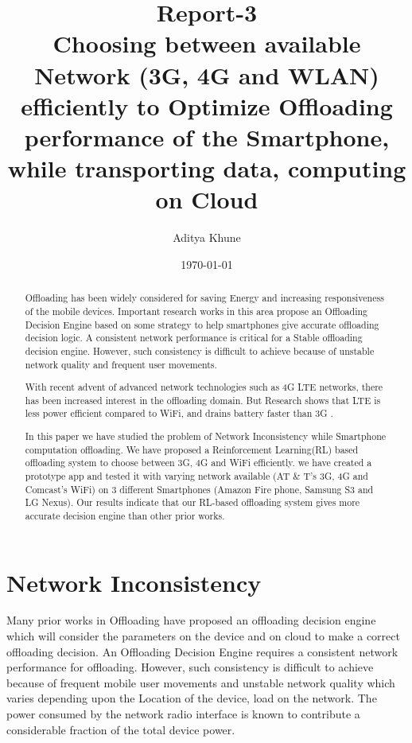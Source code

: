 \documentclass[12pt, twocolumn]{article}
\begin{document}
\title{Report-3\\
Choosing between available Network (3G, 4G and WLAN)\\
efficiently to Optimize Offloading performance of the Smartphone, while transporting data, computing on Cloud}

\author{Aditya Khune}

\date{\today}  %
\maketitle
\tableofcontents



\begin{abstract}
Offloading has been widely considered for saving Energy and increasing responsiveness of the mobile devices.
Important research works in this area propose an Offloading Decision Engine based on some strategy to help smartphones give accurate offloading decision logic. A consistent network performance is critical for a Stable offloading decision engine. However, such consistency is difficult to achieve because of unstable network quality and frequent user movements. 

With recent advent of advanced network technologies such as 4G LTE networks, there has been increased interest in the offloading domain. But Research shows that LTE is less power efficient compared to WiFi, and drains battery faster than 3G \cite{huang2012close}.

In this paper we have studied the problem of Network Inconsistency while Smartphone computation offloading. We have proposed a Reinforcement Learning(RL) based offloading system to choose between 3G, 4G and WiFi efficiently. we have created a prototype app and tested it with varying network available (AT \& T's 3G, 4G and Comcast's WiFi) on 3 different Smartphones
(Amazon Fire phone, Samsung S3 and LG Nexus). Our results indicate that our RL-based offloading system gives more accurate decision engine than other prior works.

\end{abstract}

\chapter{Network Inconsistency} %
Many prior works in Offloading have proposed an offloading decision engine which will consider the parameters on the device and on cloud to make a correct offloading decision. An Offloading Decision Engine requires a consistent network performance for offloading. However, such consistency is difficult to achieve because of frequent mobile user movements and unstable network quality which varies depending upon the Location of the device, load on the network. The power consumed by the network radio interface is known to contribute a considerable fraction of the total device power. 
\end{document}
